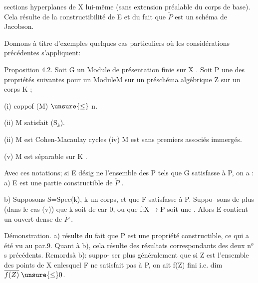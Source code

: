 
sections hyperplanes de X lui-même (sans extension préalable du corps
de base). Cela résulte  de la constructibilité de E et du fait
que $\check{P}$ est un schéma de Jacobson.

Donnons à titre d'exemples quelques cas particuliers où les
considérations précédentes s'appliquent:

\uline{Proposition} 4.2. Soit G un Module de présentation finie sur X .
Soit P une des propriétés suivantes pour un ModuleM sur un préschéma
algébrique Z sur un corps K ;


(i) coppof (M) $\unsure{\leq}$ n.

(ii) M satisfait (S$_{k}$).

(i\unsure{}i) M est Cohen-Macaulay
cycles
(iv) M est sans  premiers associés immergés.

(v) M est séparable sur  K .



 Avec ces notations; si E désig%
ne l'ensemble des \hand{$\xi\in$} P tels que G\hand{$_{\xi}$} satisfasse à P, on a :
a) E est une partie constructible de $\check{P}$ .

b) Supposons S=Spec(k), k un corps, et que F satisfasse à P. Suppo-%
sons de plus (dans le cas (v)) que k soit de car 0, ou que f:X$\rightarrow$P soit une . 
Alors E contient un ouvert dense de $\check{P}$ .

Démonstration. a) résulte du fait que P est une propriété
constructible, ce qui a été vu au par.9. Quant à b), cela résulte
des résultats correspondants des deux n$^{o}$s précédents. Remordsà b): suppo-%
ser plus généralement que si Z est l'ensemble des points de X enlesquel%
F ne satisfait pas à P, on ait f(Z) fini i.e. dim $\overline{f(Z)}\;\unsure{\leq}0$.

